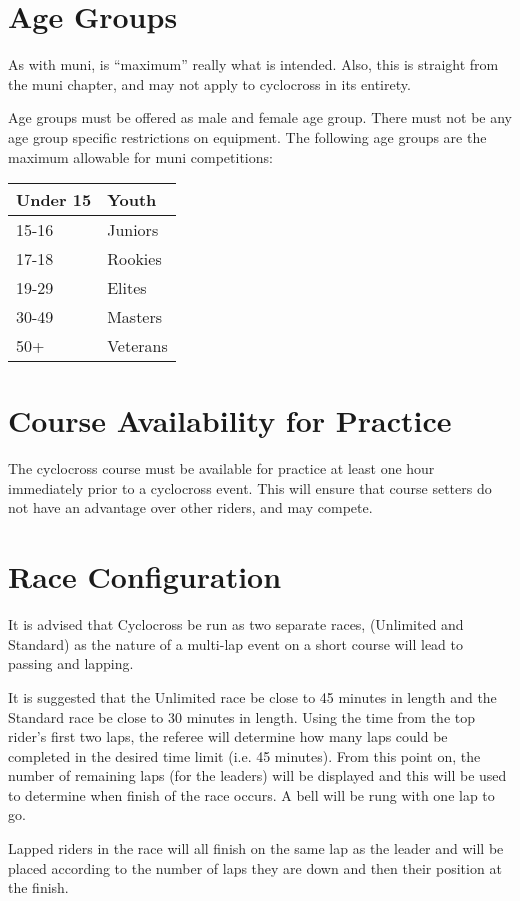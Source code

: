 \section{Age Groups}

\begin{comment2016}
As with muni, is ``maximum'' really what is intended.  Also, this is straight from the muni chapter, and may not apply to cyclocross in its entirety.
\end{comment2016}

Age groups must be offered as male and female age group.
There must not be any age group specific restrictions on equipment.
The following age groups are the maximum allowable for muni competitions:

\begin{tabular}{|l|l|}
\hline
Under 15 & Youth \\
\hline
15-16 & Juniors \\
\hline
17-18 & Rookies \\
\hline
19-29 & Elites \\
\hline
30-49 & Masters \\
\hline
50+ & Veterans \\
\hline
\end{tabular}

\section{Course Availability for Practice}

The cyclocross course must be available for practice at least one hour immediately prior to a cyclocross event.
This will ensure that course setters do not have an advantage over other riders, and may compete.

\section{Race Configuration}

It is advised that Cyclocross be run as two separate races, (Unlimited and Standard) as the nature of a multi-lap event on a short course will lead to passing and lapping.

It is suggested that the Unlimited race be close to 45 minutes in length and the Standard race be close to 30 minutes in length.
Using the time from the top rider's first two laps, the referee will determine how many laps could be completed in the desired time limit (i.e. 45 minutes).
From this point on, the number of remaining laps (for the leaders) will be displayed and this will be used to determine when finish of the race occurs.
A bell will be rung with one lap to go.

Lapped riders in the race will all finish on the same lap as the leader and will be placed according to the number of laps they are down and then their position at the finish.

